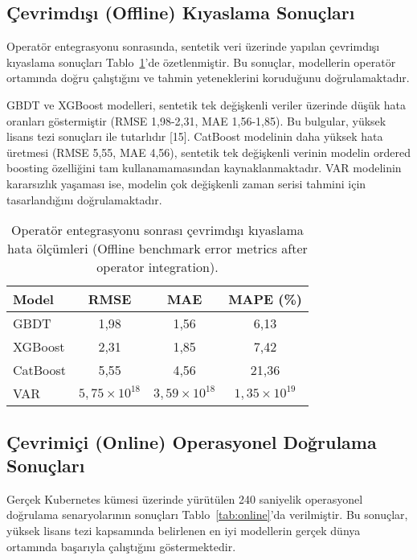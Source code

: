 \documentclass[12pt,a4paper]{article}
\begin{document}
\subsection{Çevrimdışı (Offline) Kıyaslama Sonuçları}

Operatör entegrasyonu sonrasında, sentetik veri üzerinde yapılan çevrimdışı kıyaslama sonuçları Tablo~\ref{tab:offline}'de özetlenmiştir. Bu sonuçlar, modellerin operatör ortamında doğru çalıştığını ve tahmin yeteneklerini koruduğunu doğrulamaktadır.

GBDT ve XGBoost modelleri, sentetik tek değişkenli veriler üzerinde düşük hata oranları göstermiştir (RMSE 1,98-2,31, MAE 1,56-1,85). Bu bulgular, yüksek lisans tezi sonuçları ile tutarlıdır [15]. CatBoost modelinin daha yüksek hata üretmesi (RMSE 5,55, MAE 4,56), sentetik tek değişkenli verinin modelin ordered boosting özelliğini tam kullanamamasından kaynaklanmaktadır. VAR modelinin kararsızlık yaşaması ise, modelin çok değişkenli zaman serisi tahmini için tasarlandığını doğrulamaktadır.

\begin{table}[h]
    \centering
    \caption{Operatör entegrasyonu sonrası çevrimdışı kıyaslama hata ölçümleri (Offline benchmark error metrics after operator integration).}
    \label{tab:offline}
    \begin{tabular}{@{}lccc@{}}
        \toprule
        Model & RMSE & MAE & MAPE (\%) \\
        \midrule
        GBDT & 1,98 & 1,56 & 6,13 \\
        XGBoost & 2,31 & 1,85 & 7,42 \\
        CatBoost & 5,55 & 4,56 & 21,36 \\
        VAR & $5,75\times10^{18}$ & $3,59\times10^{18}$ & $1,35\times10^{19}$ \\
        \bottomrule
    \end{tabular}
\end{table}

\subsection{Çevrimiçi (Online) Operasyonel Doğrulama Sonuçları}

Gerçek Kubernetes kümesi üzerinde yürütülen 240 saniyelik operasyonel doğrulama senaryolarının sonuçları Tablo~\ref{tab:online}'da verilmiştir. Bu sonuçlar, yüksek lisans tezi kapsamında belirlenen en iyi modellerin gerçek dünya ortamında başarıyla çalıştığını göstermektedir.
\end{document}
